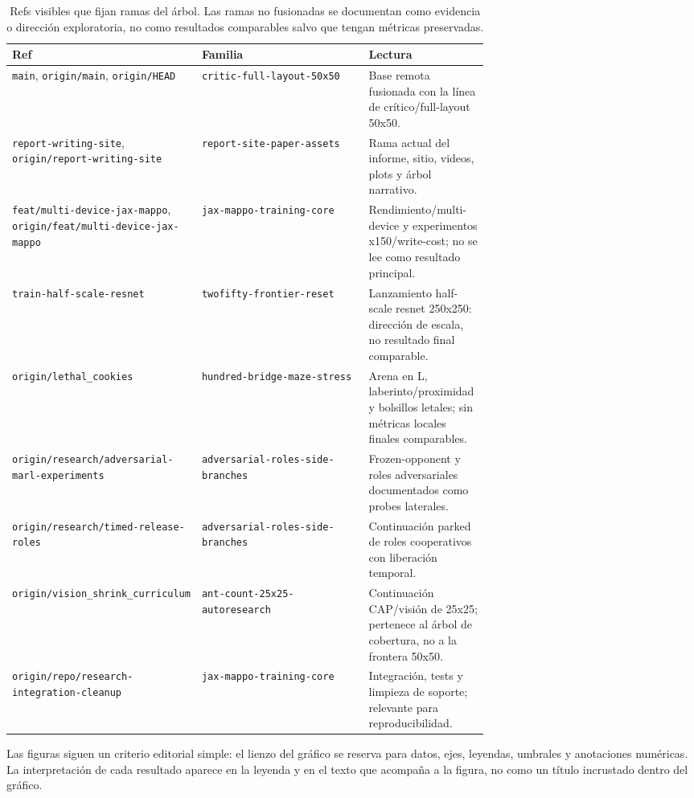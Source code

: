 \documentclass[11pt,a4paper]{article}
\newcommand{\run}[1]{\nolinkurl{#1}}
\begin{document}
\begin{table}[p]
\centering
\scriptsize
\caption{Refs visibles que fijan ramas del árbol. Las ramas no fusionadas se documentan como evidencia o dirección exploratoria, no como resultados comparables salvo que tengan métricas preservadas.}
\begin{tabularx}{\linewidth}{>{\raggedright\arraybackslash}p{0.34\linewidth}>{\raggedright\arraybackslash}p{0.35\linewidth}X}
\toprule
Ref & Familia & Lectura \\
\midrule
\run{main}, \run{origin/main}, \run{origin/HEAD} & \run{critic-full-layout-50x50} & Base remota fusionada con la línea de crítico/full-layout 50x50. \\
\run{report-writing-site}, \run{origin/report-writing-site} & \run{report-site-paper-assets} & Rama actual del informe, sitio, videos, plots y árbol narrativo. \\
\run{feat/multi-device-jax-mappo}, \run{origin/feat/multi-device-jax-mappo} & \run{jax-mappo-training-core} & Rendimiento/multi-device y experimentos x150/write-cost; no se lee como resultado principal. \\
\run{train-half-scale-resnet} & \run{twofifty-frontier-reset} & Lanzamiento half-scale resnet 250x250: dirección de escala, no resultado final comparable. \\
\run{origin/lethal_cookies} & \run{hundred-bridge-maze-stress} & Arena en L, laberinto/proximidad y bolsillos letales; sin métricas locales finales comparables. \\
\run{origin/research/adversarial-marl-experiments} & \run{adversarial-roles-side-branches} & Frozen-opponent y roles adversariales documentados como probes laterales. \\
\run{origin/research/timed-release-roles} & \run{adversarial-roles-side-branches} & Continuación parked de roles cooperativos con liberación temporal. \\
\run{origin/vision_shrink_curriculum} & \run{ant-count-25x25-autoresearch} & Continuación CAP/visión de 25x25; pertenece al árbol de cobertura, no a la frontera 50x50. \\
\run{origin/repo/research-integration-cleanup} & \run{jax-mappo-training-core} & Integración, tests y limpieza de soporte; relevante para reproducibilidad. \\
\bottomrule
\end{tabularx}
\end{table}

Las figuras siguen un criterio editorial simple: el lienzo del gráfico se reserva para datos, ejes, leyendas, umbrales y anotaciones numéricas. La interpretación de cada resultado aparece en la leyenda y en el texto que acompaña a la figura, no como un título incrustado dentro del gráfico.
\end{document}

